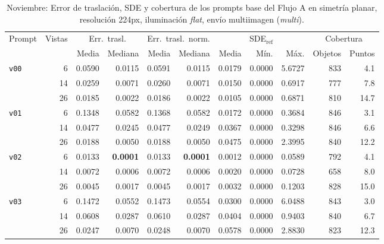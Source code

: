 \begin{table}[htbp]
\centering
\caption{Noviembre: Error de traslación, SDE y cobertura de los prompts base del Flujo A en simetría planar, resolución 224px, iluminación \textit{flat}, envío multiimagen (\textit{multi}).}
\label{tab:nov_plane_base_posicion}
\begin{lrbox}{\tablebox}
\begin{adjustbox}{max width=\textwidth}
\begin{tabular}{lrrrrrrrrrr}
\toprule
\multirow{2}{*}{Prompt} & \multirow{2}{*}{Vistas} & \multicolumn{2}{c}{Err.\ trasl.} & \multicolumn{2}{c}{Err.\ trasl.\ norm.} & \multicolumn{3}{c}{SDE$_{\mathrm{ref}}$} & \multicolumn{2}{c}{Cobertura} \\
\cmidrule(lr){3-4} \cmidrule(lr){5-6} \cmidrule(lr){7-9} \cmidrule(lr){10-11}
 &  & Media & Mediana & Media & Mediana & Media & Mín. & Máx. & Objetos & Puntos \\
\midrule
\multirow{3}{*}{\texttt{v00}} & 6 & 0.0590 & 0.0115 & 0.0591 & 0.0115 & 0.0179 & 0.0000 & 5.6727 & 833 & 4.1 \\
 & 14 & 0.0259 & 0.0071 & 0.0260 & 0.0071 & 0.0150 & 0.0000 & 0.6917 & 777 & 7.8 \\
 & 26 & 0.0185 & 0.0022 & 0.0186 & 0.0022 & 0.0105 & 0.0000 & 0.6871 & 810 & 14.7 \\
\midrule
\multirow{3}{*}{\texttt{v01}} & 6 & 0.1348 & 0.0582 & 0.1368 & 0.0582 & 0.0172 & 0.0000 & 0.3684 & 846 & 3.1 \\
 & 14 & 0.0477 & 0.0245 & 0.0477 & 0.0249 & 0.0367 & 0.0000 & 0.3298 & 846 & 6.6 \\
 & 26 & 0.0188 & 0.0050 & 0.0188 & 0.0050 & 0.0475 & 0.0000 & 2.3995 & 840 & 12.2 \\
\midrule
\multirow{3}{*}{\texttt{v02}} & 6 & 0.0133 & \textbf{0.0001} & 0.0133 & \textbf{0.0001} & 0.0012 & 0.0000 & 0.0589 & 792 & 4.1 \\
 & 14 & 0.0072 & 0.0006 & 0.0072 & 0.0006 & 0.0020 & 0.0000 & 0.0728 & 658 & 8.0 \\
 & 26 & 0.0045 & 0.0017 & 0.0045 & 0.0017 & 0.0032 & 0.0000 & 0.1203 & 828 & 15.0 \\
\midrule
\multirow{3}{*}{\texttt{v03}} & 6 & 0.1472 & 0.0552 & 0.1473 & 0.0554 & 0.0300 & 0.0000 & 6.0488 & 843 & 3.0 \\
 & 14 & 0.0608 & 0.0287 & 0.0610 & 0.0287 & 0.0404 & 0.0000 & 0.9403 & 840 & 6.7 \\
 & 26 & 0.0247 & 0.0070 & 0.0248 & 0.0070 & 0.0578 & 0.0000 & 2.8830 & 823 & 12.3 \\

\end{tabular}
\end{adjustbox}
\end{lrbox}
\end{table}
